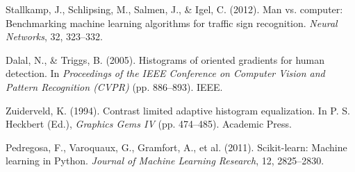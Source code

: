 
\sloppy

\begin{enumerate}[label={[\arabic*]}]
    \item Stallkamp, J., Schlipsing, M., Salmen, J., \& Igel, C. (2012). Man vs. computer: Benchmarking machine learning algorithms for traffic sign recognition. \textit{Neural Networks}, 32, 323--332.
    \item Dalal, N., \& Triggs, B. (2005). Histograms of oriented gradients for human detection. In \textit{Proceedings of the IEEE Conference on Computer Vision and Pattern Recognition (CVPR)} (pp. 886--893). IEEE.
    \item Zuiderveld, K. (1994). Contrast limited adaptive histogram equalization. In P. S. Heckbert (Ed.), \textit{Graphics Gems IV} (pp. 474--485). Academic Press.
    \item Pedregosa, F., Varoquaux, G., Gramfort, A., et al. (2011). Scikit-learn: Machine learning in Python. \textit{Journal of Machine Learning Research}, 12, 2825--2830.
\end{enumerate}
